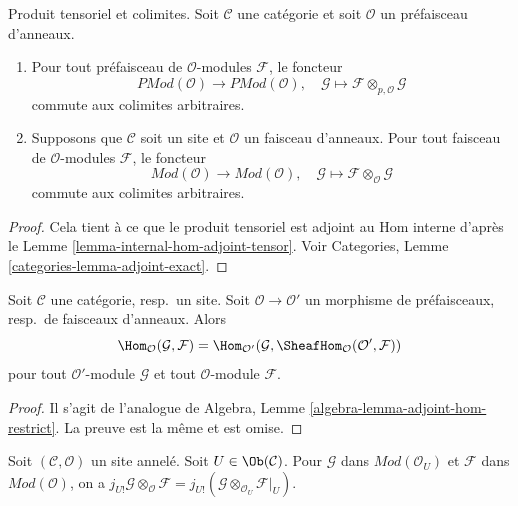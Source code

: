 \begin{lemma}
\label{lemma-tensor-commute-colimits}
Produit tensoriel et colimites.
Soit $\mathcal{C}$ une catégorie et soit $\mathcal{O}$ un préfaisceau
d'anneaux.
\begin{enumerate}
\item Pour tout préfaisceau de $\mathcal{O}$-modules $\mathcal{F}$, le foncteur
$$
\textit{PMod}(\mathcal{O}) \longrightarrow \textit{PMod}(\mathcal{O})
, \quad
\mathcal{G} \longmapsto \mathcal{F} \otimes_{p, \mathcal{O}} \mathcal{G}
$$
commute aux colimites arbitraires.
\item
Supposons que $\mathcal{C}$ soit un site et $\mathcal{O}$ un faisceau
d'anneaux. Pour tout faisceau de $\mathcal{O}$-modules $\mathcal{F}$, le
foncteur
$$
\textit{Mod}(\mathcal{O}) \longrightarrow \textit{Mod}(\mathcal{O})
, \quad
\mathcal{G} \longmapsto \mathcal{F} \otimes_\mathcal{O} \mathcal{G}
$$
commute aux colimites arbitraires.
\end{enumerate}
\end{lemma}

\begin{proof}
Cela tient à ce que le produit tensoriel est adjoint au Hom interne d'après
le Lemme \ref{lemma-internal-hom-adjoint-tensor}.
Voir Categories, Lemme \ref{categories-lemma-adjoint-exact}.
\end{proof}

\begin{lemma}
\label{lemma-adjoint-hom-restrict}
Soit $\mathcal{C}$ une catégorie, resp.\ un site.
Soit $\mathcal{O} \to \mathcal{O}'$ un morphisme de préfaisceaux, resp.\ de
faisceaux d'anneaux. Alors
$$
\Hom_\mathcal{O}(\mathcal{G}, \mathcal{F}) =
\Hom_{\mathcal{O}'}(\mathcal{G},
\SheafHom_\mathcal{O}(\mathcal{O}', \mathcal{F}))
$$
pour tout $\mathcal{O}'$-module $\mathcal{G}$ et tout $\mathcal{O}$-module
$\mathcal{F}$.
\end{lemma}

\begin{proof}
Il s'agit de l'analogue de
Algebra, Lemme \ref{algebra-lemma-adjoint-hom-restrict}.
La preuve est la même et est omise.
\end{proof}

\begin{lemma}
\label{lemma-j-shriek-and-tensor}
Soit $(\mathcal{C}, \mathcal{O})$ un site annelé.
Soit $U \in \Ob(\mathcal{C})$.
Pour $\mathcal{G}$ dans $\textit{Mod}(\mathcal{O}_U)$ et $\mathcal{F}$ dans
$\textit{Mod}(\mathcal{O})$, on a
$j_{U!}\mathcal{G} \otimes_\mathcal{O} \mathcal{F} =
j_{U!}(\mathcal{G} \otimes_{\mathcal{O}_U} \mathcal{F}|_U)$.
\end{lemma}

